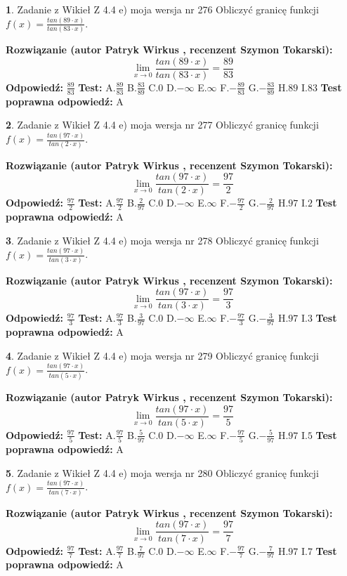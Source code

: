 \documentclass[12pt, a4paper]{article}
\theoremstyle{definition} %
\newtheorem{zad}{}
\newcommand{\zadStart}[1]{\begin{zad}#1\newline}
\newcommand{\zadStop}{\end{zad}}
\newcommand{\rozwStart}[2]{\noindent \textbf{Rozwiązanie (autor #1 , recenzent #2): }\newline}
\newcommand{\rozwStop}{\newline}
\newcommand{\odpStart}{\noindent \textbf{Odpowiedź:}\newline}
\newcommand{\odpStop}{\newline}
\newcommand{\testStart}{\noindent \textbf{Test:}\newline}
\newcommand{\testStop}{\newline}
\newcommand{\kluczStart}{\noindent \textbf{Test poprawna odpowiedź:}\newline}
\newcommand{\kluczStop}{\newline}
\begin{document}
\zadStart{Zadanie z Wikieł Z 4.4 e) moja wersja nr 276}
Obliczyć granicę funkcji $f(x)=\frac{tan(89\cdot x)}{tan(83\cdot x)}$.
\zadStop
\rozwStart{Patryk Wirkus}{Szymon Tokarski}
$$\lim\limits_{x\to 0}\frac{tan(89\cdot x)}{tan(83\cdot x)}=
\frac{89}{83}$$
\rozwStop
\odpStart
$\frac{89}{83}$
\odpStop
\testStart
A.$\frac{89}{83}$
B.$\frac{83}{89}$
C.$0$
D.$-\infty$
E.$\infty$
F.$-\frac{89}{83}$
G.$-\frac{83}{89}$
H.$89$
I.$83$
\testStop
\kluczStart
A
\kluczStop



\zadStart{Zadanie z Wikieł Z 4.4 e) moja wersja nr 277}
Obliczyć granicę funkcji $f(x)=\frac{tan(97\cdot x)}{tan(2\cdot x)}$.
\zadStop
\rozwStart{Patryk Wirkus}{Szymon Tokarski}
$$\lim\limits_{x\to 0}\frac{tan(97\cdot x)}{tan(2\cdot x)}=
\frac{97}{2}$$
\rozwStop
\odpStart
$\frac{97}{2}$
\odpStop
\testStart
A.$\frac{97}{2}$
B.$\frac{2}{97}$
C.$0$
D.$-\infty$
E.$\infty$
F.$-\frac{97}{2}$
G.$-\frac{2}{97}$
H.$97$
I.$2$
\testStop
\kluczStart
A
\kluczStop



\zadStart{Zadanie z Wikieł Z 4.4 e) moja wersja nr 278}
Obliczyć granicę funkcji $f(x)=\frac{tan(97\cdot x)}{tan(3\cdot x)}$.
\zadStop
\rozwStart{Patryk Wirkus}{Szymon Tokarski}
$$\lim\limits_{x\to 0}\frac{tan(97\cdot x)}{tan(3\cdot x)}=
\frac{97}{3}$$
\rozwStop
\odpStart
$\frac{97}{3}$
\odpStop
\testStart
A.$\frac{97}{3}$
B.$\frac{3}{97}$
C.$0$
D.$-\infty$
E.$\infty$
F.$-\frac{97}{3}$
G.$-\frac{3}{97}$
H.$97$
I.$3$
\testStop
\kluczStart
A
\kluczStop



\zadStart{Zadanie z Wikieł Z 4.4 e) moja wersja nr 279}
Obliczyć granicę funkcji $f(x)=\frac{tan(97\cdot x)}{tan(5\cdot x)}$.
\zadStop
\rozwStart{Patryk Wirkus}{Szymon Tokarski}
$$\lim\limits_{x\to 0}\frac{tan(97\cdot x)}{tan(5\cdot x)}=
\frac{97}{5}$$
\rozwStop
\odpStart
$\frac{97}{5}$
\odpStop
\testStart
A.$\frac{97}{5}$
B.$\frac{5}{97}$
C.$0$
D.$-\infty$
E.$\infty$
F.$-\frac{97}{5}$
G.$-\frac{5}{97}$
H.$97$
I.$5$
\testStop
\kluczStart
A
\kluczStop



\zadStart{Zadanie z Wikieł Z 4.4 e) moja wersja nr 280}
Obliczyć granicę funkcji $f(x)=\frac{tan(97\cdot x)}{tan(7\cdot x)}$.
\zadStop
\rozwStart{Patryk Wirkus}{Szymon Tokarski}
$$\lim\limits_{x\to 0}\frac{tan(97\cdot x)}{tan(7\cdot x)}=
\frac{97}{7}$$
\rozwStop
\odpStart
$\frac{97}{7}$
\odpStop
\testStart
A.$\frac{97}{7}$
B.$\frac{7}{97}$
C.$0$
D.$-\infty$
E.$\infty$
F.$-\frac{97}{7}$
G.$-\frac{7}{97}$
H.$97$
I.$7$
\testStop
\kluczStart
A
\kluczStop
\end{document}
